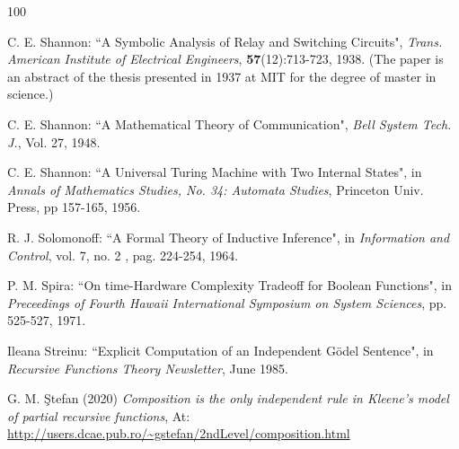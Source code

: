 \begin{thebibliography}{100}

 C. E. Shannon: ``A Symbolic Analysis of Relay and Switching Circuits", {\em Trans. American Institute of Electrical Engineers}, {\bf  57}(12):713-723, 1938. (The paper is an abstract of the thesis presented in 1937 at MIT for the degree of master in science.)

 C. E. Shannon: ``A Mathematical Theory of Communication", {\em Bell System Tech. J.}, Vol. 27, 1948.

 C. E. Shannon: ``A Universal Turing Machine with Two Internal States", in {\em Annals of Mathematics Studies, No. 34: Automata Studies}, Princeton Univ. Press, pp 157-165, 1956.



 R. J. Solomonoff: ``A Formal Theory of Inductive Inference", in {\em Information and Control}, vol. 7, no. 2 , pag. 224-254, 1964.

 P. M. Spira: ``On time-Hardware Complexity Tradeoff for Boolean Functions", in {\em Preceedings of Fourth Hawaii International Symposium on System Sciences}, pp. 525-527, 1971.


 Ileana Streinu: ``Explicit Computation of an Independent G\"{o}del Sentence", in {\em Recursive Functions Theory Newsletter}, June 1985.

    G. M. \c Stefan (2020) {\em Composition is the only independent rule in Kleene's model of partial recursive functions}, At: \url{http://users.dcae.pub.ro/~gstefan/2ndLevel/composition.html}



\end{thebibliography}
